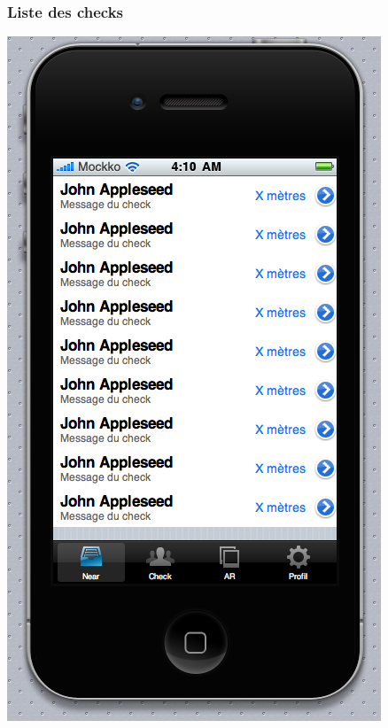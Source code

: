\documentclass[a4paper,12pt]{report}
\begin{document}
\begin{onehalfspace}
\subsubsection{Liste des checks}
\begin{center}
\includegraphics[height=\thehauteurscreen cm]{img/2_near.png}
\end{center}


\end{onehalfspace}
\end{document}
